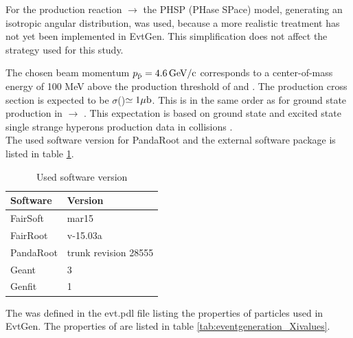 For the production reaction \pbarpSystem $\rightarrow$ \excitedcascade\anticascade the PHSP (PHase SPace) model, 
generating an isotropic angular distribution, was used,
because a more realistic treatment has not yet been implemented in EvtGen. 
This simplification does not affect the strategy used for this study.

The chosen beam momentum $p_{\bar{\textnormal{p}}} = 4.6\, \textnormal{GeV/c}$ corresponds to a center-of-mass energy 
of 100 MeV above the production threshold of \excitedcascade and \anticascade.
The production cross section is expected to be $\sigma$(\mychannel)$\simeq 1 \mu\textnormal{b}$. This is in the same order as for ground 
state \cascade production in \pbarpSystem $\rightarrow$ \cascade\anticascade \cite{PANDAphysics2009}.
This expectation is based on ground state and excited state single strange hyperons production data in \pbarpSystem collisions \cite{CERN}.
\\

The used software version for PandaRoot and the external software package is listed in table \ref{tab:eventgeneration_software}.

\begin{table}[tb]
	\centering
	\caption{Used software version}
	\label{tab:eventgeneration_software}
	\begin{tabular}{ll}
		\hline
		Software & Version \\
		\hline
		\hline
		FairSoft & mar15\\
		FairRoot & v-15.03a \\
		PandaRoot & trunk revision 28555 \\
		Geant & 3\\
		Genfit & 1\\\hline
			 
	\end{tabular}
\end{table}


The \excitedcascade was defined in the evt.pdl file listing the properties of particles used in EvtGen. 
The properties of \excitedcascade are listed in table \ref{tab:eventgeneration_Xivalues}.


